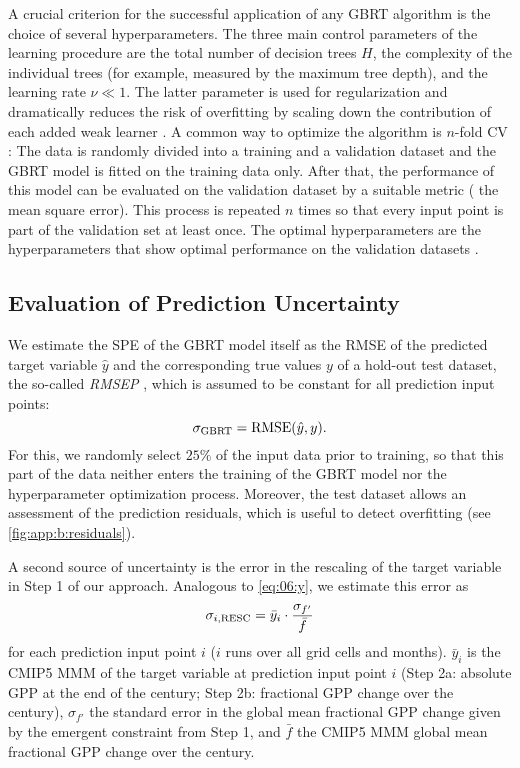 A crucial criterion for the successful application of any \ac{GBRT} algorithm
is the choice of several hyperparameters. The three main control parameters of
the learning procedure are the total number of decision trees $H$, the
complexity of the individual trees (for example, measured by the maximum tree
depth), and the learning rate $\nu \ll 1$. The latter parameter is used for
regularization and dramatically reduces the risk of overfitting by scaling down
the contribution of each added weak learner \autocite{Death2007, Elith2008,
  Friedman2001}. A common way to optimize the algorithm is $n$-fold \acf{CV}
\autocite{Bishop2006}: The data is randomly divided into a training and a
validation dataset and the \acs{GBRT} model is fitted on the training data
only. After that, the performance of this model can be evaluated on the
validation dataset by a suitable metric (\eg{} the mean square error). This
process is repeated $n$ times so that every input point is part of the
validation set at least once. The optimal hyperparameters are the
hyperparameters that show optimal performance on the validation datasets
\autocite{Elith2008}.


\subsection{Evaluation of Prediction Uncertainty}
\label{subsec:app:b:uncertainty}

We estimate the \acf{SPE} of the \ac{GBRT} model itself as the \ac{RMSE} of the
predicted target variable $\hat{y}$ and the corresponding true values $y$ of a
hold-out test dataset, the so-called \emph{\acf{RMSEP}} \autocite{Bishop2006},
which is assumed to be constant for all prediction input points:
\begin{equation}
  \sigma_{\textnormal{GBRT}} = \textnormal{RMSE}(\hat{y}, y).
  \label{eq:app:b:sigma_gbrt}
\end{equation}
For this, we randomly select $25 \unit{\%}$ of the input data prior to
training, so that this part of the data neither enters the training of the
\ac{GBRT} model nor the hyperparameter optimization process. Moreover, the test
dataset allows an assessment of the prediction residuals, which is useful to
detect overfitting (see \cref{fig:app:b:residuals}).

A second source of uncertainty is the error in the rescaling of the target
variable in Step 1 of our approach. Analogous to \cref{eq:06:y}, we estimate
this error as
\begin{equation}
  \sigma_{i, \textnormal{RESC}} = \bar{y}_i \cdot \frac{\sigma_{f'}}{\bar{f}}
  \label{eq:app:b:sigma_rescaling}
\end{equation}
for each prediction input point $i$ ($i$ runs over all grid cells and months).
$\bar{y}_i$ is the \acs{CMIP}5 \acf{MMM} of the target variable at prediction
input point $i$ (Step 2a: absolute \ac{GPP} at the end of the  century;
Step 2b: fractional \ac{GPP} change over the  century), $\sigma_{f'}$
the standard error in the global mean fractional \acs{GPP} change given by the
emergent constraint from Step 1, and $\bar{f}$ the \acs{CMIP}5 \ac{MMM} global
mean fractional \ac{GPP} change over the  century.

